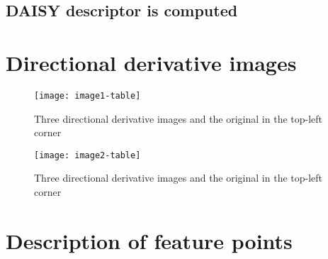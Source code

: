 \subsection{DAISY descriptor is computed}

\section{Directional derivative images}

\begin{figure}\label{fig:face}
  \texttt{[image: image1-table]}
  \caption{Three directional derivative images and the original in the top-left
  corner}
\end{figure}

\begin{figure}\label{fig:grasshopper}
  \texttt{[image: image2-table]}
  \caption{Three directional derivative images and the original in the top-left
  corner}
\end{figure}

\section{Description of feature points}
